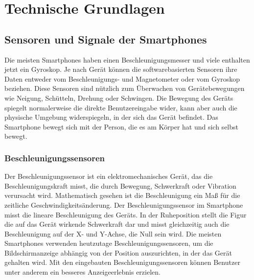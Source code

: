 %
%
%
%
\section{Technische Grundlagen} \label{Technik}



\subsection{Sensoren und Signale der Smartphones}

%
%
%
%
%
Die meisten Smartphones haben einen Beschleunigungsmesser und viele enthalten jetzt ein Gyroskop. Je nach Gerät können die softwarebasierten Sensoren ihre Daten entweder vom Beschleunigungs- und Magnetometer oder vom Gyroskop beziehen. Diese Sensoren sind nützlich zum Überwachen von Gerätebewegungen wie Neigung, Schütteln, Drehung oder Schwingen. Die Bewegung des Geräts spiegelt normalerweise die direkte Benutzereingabe wider, kann aber auch die physische Umgebung widerspiegeln, in der sich das Gerät befindet. Das Smartphone bewegt sich mit der Person, die es am Körper hat und sich selbst bewegt.\citep{DevelopersMotionSen}



%
%
%
%


\subsubsection{Beschleunigungssensoren}

Der Beschleunigungssensor ist ein elektromechanisches Gerät, das die Beschleunigungskraft misst, die durch Bewegung, Schwerkraft oder Vibration verursacht wird. Mathematisch gesehen ist die Beschleunigung ein Maß für die zeitliche Geschwindigkeitsänderung.
Der Beschleunigungssensor im Smartphone misst die lineare Beschleunigung des Geräts. In der Ruheposition stellt die Figur die auf das Gerät wirkende Schwerkraft dar und misst gleichzeitig auch die Beschleunigung auf der X- und Y-Achse, die Null sein wird.
Die meisten Smartphones verwenden heutzutage Beschleunigungssensoren, um die Bildschirmanzeige abhängig von der Position auszurichten, in der das Gerät gehalten wird. Mit den eingebauten Beschleunigungssensoren können Benutzer unter anderem ein besseres Anzeigeerlebnis erzielen. \citep{Sharma2020}

